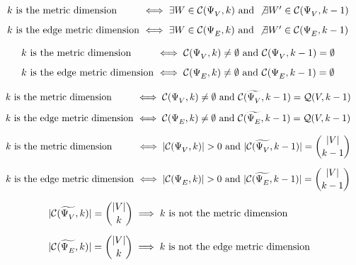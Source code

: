 \begin{corollary}
	\label{cor:metric-dimension-from-existence}
	\[\begin{array}{l@{\ }l}
		k \text{ is the metric dimension} &\iff \exists W \in \Ccal(\resolving{V},k) \text{ and } \not\exists W' \in \Ccal(\resolving{V},k - 1) \\ [8pt]
		k \text{ is the edge metric dimension} &\iff \exists W \in \Ccal(\resolving{E},k) \text{ and } \not\exists W' \in \Ccal(\resolving{E},k - 1)
	\end{array}\]
\end{corollary}

\begin{corollary}
	\[\begin{array}{l@{\ }l}
		k \text{ is the metric dimension} &\iff \Ccal(\resolving{V},k) \neq \emptyset \text{ and } \Ccal(\resolving{V},k - 1) = \emptyset \\ [8pt]
		k \text{ is the edge metric dimension} &\iff \Ccal(\resolving{E},k) \neq \emptyset \text{ and } \Ccal(\resolving{E},k - 1) = \emptyset
	\end{array}\]
\end{corollary}

\begin{corollary}
	\[\begin{array}{l@{\ }l}
		k \text{ is the metric dimension} &\iff \Ccal(\resolving{V},k) \neq \emptyset \text{ and } \Ccal(\nonresolving{V},k - 1) = \Qcal(V,k - 1) \\ [8pt]
		k \text{ is the edge metric dimension} &\iff \Ccal(\resolving{E},k) \neq \emptyset \text{ and } \Ccal(\nonresolving{E},k - 1) = \Qcal(V,k - 1)
	\end{array}\]
\end{corollary}

\begin{corollary}
	\[\begin{array}{l@{\ }l}
		k \text{ is the metric dimension} &\iff |\Ccal(\resolving{V},k)| > 0 \text{ and } |\Ccal(\nonresolving{V},k - 1)| = \displaystyle \binom{|V|}{k - 1} \\ [16pt]
		k \text{ is the edge metric dimension} &\iff |\Ccal(\resolving{E},k)| > 0 \text{ and } |\Ccal(\nonresolving{E},k - 1)| = \displaystyle \binom{|V|}{k - 1}
	\end{array}\]
\end{corollary}

\begin{corollary}
	\[\begin{array}{l@{\ }l}
		|\Ccal(\nonresolving{V},k)| = \displaystyle \binom{|V|}{k} \implies k \text{ is not the metric dimension} \\ [16pt]
		|\Ccal(\nonresolving{E},k)| = \displaystyle \binom{|V|}{k} \implies k \text{ is not the edge metric dimension}
	\end{array}\]
\end{corollary}

